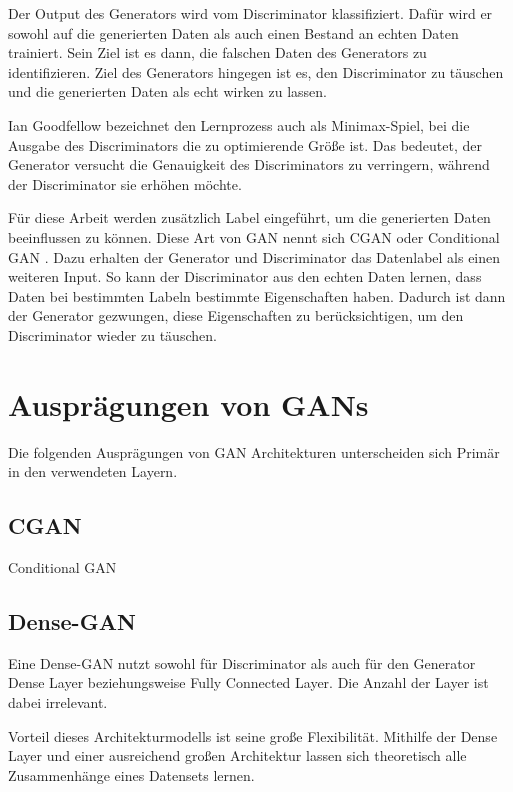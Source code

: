 Der Output des Generators wird vom Discriminator klassifiziert.
Dafür wird er sowohl auf die generierten Daten als auch einen Bestand an echten Daten trainiert.
Sein Ziel ist es dann, die falschen Daten des Generators zu identifizieren.
Ziel des Generators hingegen ist es, den Discriminator zu täuschen und die generierten Daten als echt wirken zu lassen.
\newline

Ian Goodfellow bezeichnet den Lernprozess auch als Minimax-Spiel, bei die Ausgabe des Discriminators die zu optimierende Größe ist.
Das bedeutet, der Generator versucht die Genauigkeit des Discriminators zu verringern, während der Discriminator sie erhöhen möchte. \cite{gan-minimax} 
\newline


Für diese Arbeit werden zusätzlich Label eingeführt, um die generierten Daten beeinflussen zu können. 
Diese Art von GAN nennt sich CGAN oder Conditional GAN \cite{gan-conditional}.
Dazu erhalten der Generator und Discriminator das Datenlabel als einen weiteren Input.
So kann der Discriminator aus den echten Daten lernen, dass Daten bei bestimmten Labeln bestimmte Eigenschaften haben.
Dadurch ist dann der Generator gezwungen, diese Eigenschaften zu berücksichtigen, um den Discriminator wieder zu täuschen.

\section{Ausprägungen von GANs}
Die folgenden Ausprägungen von GAN Architekturen unterscheiden sich Primär in den verwendeten Layern.

\subsection{CGAN}
Conditional GAN

\subsection{Dense-GAN}
Eine Dense-GAN nutzt sowohl für Discriminator als auch für den Generator Dense Layer beziehungsweise Fully Connected Layer.
Die Anzahl der Layer ist dabei irrelevant.
\newline

Vorteil dieses Architekturmodells ist seine große Flexibilität.
Mithilfe der Dense Layer und einer ausreichend großen Architektur lassen sich theoretisch alle Zusammenhänge eines Datensets lernen.
\newline

